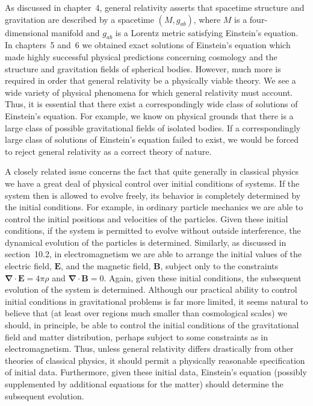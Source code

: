 
\begingroup
\renewcommand{\thetheorem}{\thesubsection.\arabic{theorem}}

As discussed in chapter~4, general relativity asserts that spacetime structure and
gravitation are described by a spacetime \((M,g_{ab})\), where \(M\) is a four-dimensional
manifold and \(g_{ab}\) is a Lorentz metric satisfying Einstein's equation. In chapters~5
and~6 we obtained exact solutions of Einstein's equation which made highly successful
physical predictions concerning cosmology and the structure and gravitation fields of
spherical bodies. However, much more is required in order that general relativity be
a physically viable theory. We see a wide variety of physical phenomena for which
general relativity must account. Thus, it is essential that there exist a correspondingly
wide class of solutions of Einstein's equation. For example, we know on physical
grounds that there is a large class of possible gravitational fields of isolated bodies.
If a correspondingly large class of solutions of Einstein's equation failed to exist, we
would be forced to reject general relativity as a correct theory of nature.

A closely related issue concerns the fact that quite generally in classical physics
we have a great deal of physical control over initial conditions of systems. If the
system then is allowed to evolve freely, its behavior is completely determined by the
initial conditions. For example, in ordinary particle mechanics we are able to control
the initial positions and velocities of the particles. Given these initial conditions, if
the system is permitted to evolve without outside interference, the dynamical evolution
of the particles is determined. Similarly, as discussed in section~10.2, in
electromagnetism we are able to arrange the initial values of the electric field,
\(\mathbf{E}\), and the magnetic field, \(\mathbf{B}\), subject only to the constraints
\(\boldsymbol{\nabla}\mathbin{\cdot}\mathbf{E}=4\pi\rho\) and
\(\boldsymbol{\nabla}\mathbin{\cdot}\mathbf{B}=0\). Again, given these initial conditions, the
subsequent evolution of the system is determined. Although our practical ability to
control initial conditions in gravitational problems is far more limited, it seems natural
to believe that (at least over regions much smaller than cosmological scales) we should,
in principle, be able to control the initial conditions of the gravitational field and matter
distribution, perhaps subject to some constraints as in electromagnetism. Thus, unless
general relativity differs drastically from other theories of classical physics, it should
permit a physically reasonable specification of initial data. Furthermore, given these
initial data, Einstein's equation (possibly supplemented by additional equations for the
matter) should determine the subsequent evolution.

